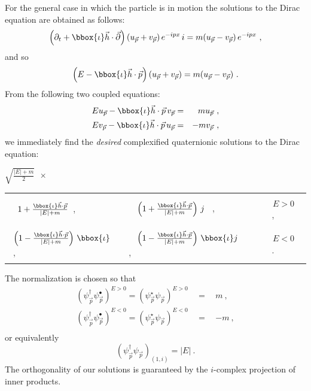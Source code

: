 For the general case in which the particle is in motion the solutions to the
Dirac equation are obtained as follows:
\[ 
\left( \partial_t  +\bbox{\iota} \vec{h} \cdot \vec{\partial} \right) 
 (u_{\vec{p}} + v_{\vec{p}}) \, e^{-ipx}\, i = 
m (u_{\vec{p}} - v_{\vec{p}} ) \, e^{-ipx}~,
\]
and so
\[ 
\left( E  - \bbox{\iota} \vec{h} \cdot \vec{p} \right) 
 (u_{\vec{p}} + v_{\vec{p}}) = 
m (u_{\vec{p}} - v_{\vec{p}} ) ~.
\]
From the following two coupled equations:
\begin{eqnarray*}
E u_{\vec{p}}  - \bbox{\iota} \vec{h} \cdot \vec{p} \, v_{\vec{p}} & = & 
m u_{\vec{p}}~,\\
E v_{\vec{p}}  - \bbox{\iota} \vec{h} \cdot \vec{p} \, u_{\vec{p}} & = & 
- m v_{\vec{p}}~,
\end{eqnarray*}
we immediately find the {\em desired} complexified quaternionic solutions  to 
the Dirac equation:
\begin{center}
$\sqrt{\frac{|E|+m}{2}}~~\times~~$
\begin{tabular}{|llc|}\hline \hline
 & & \\
~~$1 + \frac{\bbox{\iota} \vec{h} \cdot \vec{p}}{|E|+m}$~, &
~~~$\left( 1 + \frac{\bbox{\iota} \vec{h} \cdot \vec{p}}{|E|+m} \right) \, j$
~,
 & ~~~$E>0$~,~~~\\
 & & \\
\hline
 & & \\
~$\left( 1 - \frac{\bbox{\iota} \vec{h} \cdot \vec{p}}{|E|+m} \right) \, 
\bbox{\iota}$~, &
~~~$\left( 1 - \frac{\bbox{\iota} \vec{h} \cdot \vec{p}}{|E|+m} \right) \, 
\bbox{\iota} j$~,
 & ~~~$E<0$~.~~~\\
 & & \\
\hline \hline
\end{tabular}
\end{center}
The normalization is chosen so that  
\begin{eqnarray*} 
\left( \psi^{\dag}_{\vec{p}} \psi^{\bullet}_{\vec{p}} \right)^{E>0} =
\left( \psi^{\star}_{\vec{p}} \psi_{\vec{p}} \right)^{E>0} 
& ~~=~~ & m~,\\
\left( \psi^{\dag}_{\vec{p}} \psi^{\bullet}_{\vec{p}} \right)^{E<0} =
\left( \psi^{\star}_{\vec{p}} \psi_{\vec{p}} \right)^{E<0} 
& ~~=~~ & - m~,\\
\end{eqnarray*}
or equivalently
\[ \left( \psi^{\dag}_{\vec{p}} \psi_{\vec{p}} \right)_{(1,i)} =
|E|~.
\]
The orthogonality of our solutions is guaranteed by the $i$-complex projection
of inner products.



